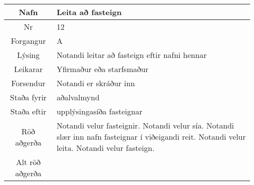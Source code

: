 \documentclass[a4paper]{article}
\begin{document}
\begin{tabular}{|c|p{10cm}|}
\hline
Nafn&Leita að fasteign \\
\hline
Nr&12\\
\hline
Forgangur&A\\
\hline
Lýsing&Notandi leitar að fasteign eftir nafni hennar\\
\hline
Leikarar&Yfirmaður eða starfsmaður\\
\hline
Forsendur&Notandi er skráður inn\\
\hline
Staða fyrir&aðalvalmynd\\
\hline
Staða eftir&upplýsingasíða fasteignar\\
\hline
Röð aðgerða&Notandi velur fasteignir. Notandi velur sía. Notandi slær inn nafn fasteignar í viðeigandi reit. Notandi velur leita. Notandi velur fasteign.\\
\hline
Alt röð aðgerða&\\
\hline
\end{tabular}
\end{document}
